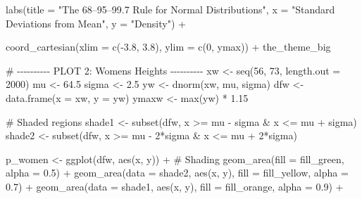 \documentclass[
  letterpaper,
  DIV=11,
  numbers=noendperiod]{scrreprt}
\newenvironment{Shaded}{\begin{snugshade}}{\end{snugshade}}
\newcommand{\AttributeTok}[1]{\textcolor[rgb]{0.40,0.45,0.13}{#1}}
\newcommand{\CommentTok}[1]{\textcolor[rgb]{0.37,0.37,0.37}{#1}}
\newcommand{\DecValTok}[1]{\textcolor[rgb]{0.68,0.00,0.00}{#1}}
\newcommand{\FloatTok}[1]{\textcolor[rgb]{0.68,0.00,0.00}{#1}}
\newcommand{\FunctionTok}[1]{\textcolor[rgb]{0.28,0.35,0.67}{#1}}
\newcommand{\NormalTok}[1]{\textcolor[rgb]{0.00,0.23,0.31}{#1}}
\newcommand{\OtherTok}[1]{\textcolor[rgb]{0.00,0.23,0.31}{#1}}
\newcommand{\SpecialCharTok}[1]{\textcolor[rgb]{0.37,0.37,0.37}{#1}}
\newcommand{\StringTok}[1]{\textcolor[rgb]{0.13,0.47,0.30}{#1}}
\begin{document}
\begin{Shaded}
\begin{Highlighting}[]
  \FunctionTok{labs}\NormalTok{(}\AttributeTok{title =} \StringTok{"The 68–95–99.7 Rule for Normal Distributions"}\NormalTok{, }
       \AttributeTok{x =} \StringTok{"Standard Deviations from Mean"}\NormalTok{, }
       \AttributeTok{y =} \StringTok{"Density"}\NormalTok{) }\SpecialCharTok{+}
  
  \FunctionTok{coord\_cartesian}\NormalTok{(}\AttributeTok{xlim =} \FunctionTok{c}\NormalTok{(}\SpecialCharTok{{-}}\FloatTok{3.8}\NormalTok{, }\FloatTok{3.8}\NormalTok{), }\AttributeTok{ylim =} \FunctionTok{c}\NormalTok{(}\DecValTok{0}\NormalTok{, ymax)) }\SpecialCharTok{+}
\NormalTok{  the\_theme\_big}

\CommentTok{\# {-}{-}{-}{-}{-}{-}{-}{-}{-}{-} PLOT 2: Women\textquotesingle{}s Heights {-}{-}{-}{-}{-}{-}{-}{-}{-}{-}}
\NormalTok{xw }\OtherTok{\textless{}{-}} \FunctionTok{seq}\NormalTok{(}\DecValTok{56}\NormalTok{, }\DecValTok{73}\NormalTok{, }\AttributeTok{length.out =} \DecValTok{2000}\NormalTok{)}
\NormalTok{mu }\OtherTok{\textless{}{-}} \FloatTok{64.5}
\NormalTok{sigma }\OtherTok{\textless{}{-}} \FloatTok{2.5}
\NormalTok{yw }\OtherTok{\textless{}{-}} \FunctionTok{dnorm}\NormalTok{(xw, mu, sigma)}
\NormalTok{dfw }\OtherTok{\textless{}{-}} \FunctionTok{data.frame}\NormalTok{(}\AttributeTok{x =}\NormalTok{ xw, }\AttributeTok{y =}\NormalTok{ yw)}
\NormalTok{ymaxw }\OtherTok{\textless{}{-}} \FunctionTok{max}\NormalTok{(yw) }\SpecialCharTok{*} \FloatTok{1.15}

\CommentTok{\# Shaded regions}
\NormalTok{shade1 }\OtherTok{\textless{}{-}} \FunctionTok{subset}\NormalTok{(dfw, x }\SpecialCharTok{\textgreater{}=}\NormalTok{ mu }\SpecialCharTok{{-}}\NormalTok{ sigma }\SpecialCharTok{\&}\NormalTok{ x }\SpecialCharTok{\textless{}=}\NormalTok{ mu }\SpecialCharTok{+}\NormalTok{ sigma)}
\NormalTok{shade2 }\OtherTok{\textless{}{-}} \FunctionTok{subset}\NormalTok{(dfw, x }\SpecialCharTok{\textgreater{}=}\NormalTok{ mu }\SpecialCharTok{{-}} \DecValTok{2}\SpecialCharTok{*}\NormalTok{sigma }\SpecialCharTok{\&}\NormalTok{ x }\SpecialCharTok{\textless{}=}\NormalTok{ mu }\SpecialCharTok{+} \DecValTok{2}\SpecialCharTok{*}\NormalTok{sigma)}

\NormalTok{p\_women }\OtherTok{\textless{}{-}} \FunctionTok{ggplot}\NormalTok{(dfw, }\FunctionTok{aes}\NormalTok{(x, y)) }\SpecialCharTok{+}
  \CommentTok{\# Shading}
  \FunctionTok{geom\_area}\NormalTok{(}\AttributeTok{fill =}\NormalTok{ fill\_green, }\AttributeTok{alpha =} \FloatTok{0.5}\NormalTok{) }\SpecialCharTok{+}
  \FunctionTok{geom\_area}\NormalTok{(}\AttributeTok{data =}\NormalTok{ shade2, }\FunctionTok{aes}\NormalTok{(x, y), }\AttributeTok{fill =}\NormalTok{ fill\_yellow, }\AttributeTok{alpha =} \FloatTok{0.7}\NormalTok{) }\SpecialCharTok{+}
  \FunctionTok{geom\_area}\NormalTok{(}\AttributeTok{data =}\NormalTok{ shade1, }\FunctionTok{aes}\NormalTok{(x, y), }\AttributeTok{fill =}\NormalTok{ fill\_orange, }\AttributeTok{alpha =} \FloatTok{0.9}\NormalTok{) }\SpecialCharTok{+}
  

\end{Highlighting}
\end{Shaded}
\end{document}
